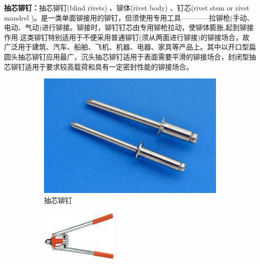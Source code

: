 \documentclass[UTF8]{article} %
\begin{document}
\textbf{抽芯铆钉：}抽芯铆钉(blind rivets) 、铆体(rivet body) 、钉芯(rivet stem or rivet mandrel )。是一类单面铆接用的铆钉，但须使用专用工具————拉铆枪(手动、电动、气动)进行铆接。铆接时，铆钉钉芯由专用铆枪拉动，使铆体膨胀,起到铆接作用.这类铆钉特别适用于不便采用普通铆钉(须从两面进行铆接)的铆接场合，故广泛用于建筑、汽车、船舶、飞机、机器、电器、家具等产品上。其中以开口型扁圆头抽芯铆钉应用最广，沉头抽芯铆钉适用于表面需要平滑的铆接场合，封闭型抽芯铆钉适用于要求较高载荷和具有一定密封性能的铆接场合。

\begin{figure}[H]
  \centering
  \begin{subfigure}[b]{0.3\textwidth}
         \centering
         \includegraphics[width=\textwidth]{mao2.png}
          \caption{抽芯铆钉}
  \end{subfigure}
  \quad
  \begin{subfigure}[b]{0.3\textwidth}
          \centering
          \includegraphics[width=\textwidth]{mao3.png}

\end{subfigure}
\end{figure}
\end{document}
